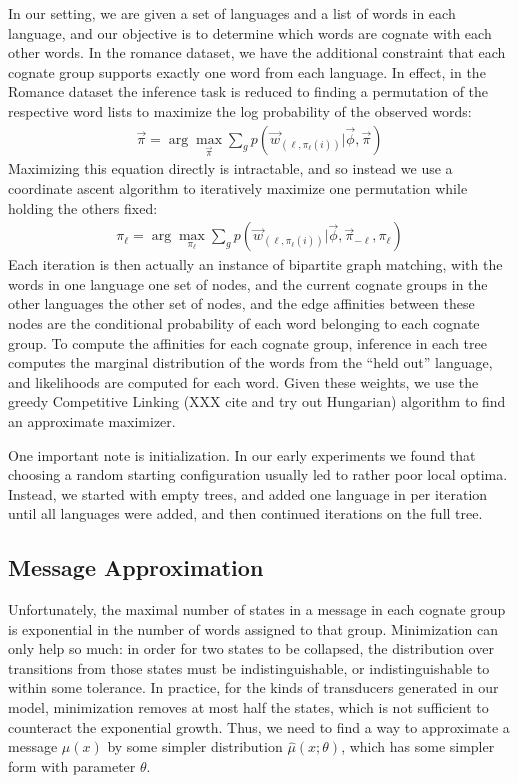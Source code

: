 \documentclass[11pt,a4paper]{article}
\begin{document}
In our setting, we are given a set of languages and a list of words
in each language, and our objective is to determine which words are
cognate with each other words. In the romance dataset, we have the
additional constraint that each cognate group supports exactly one
word from each language. In effect, in the Romance dataset the 
inference task is reduced to finding a permutation of the respective
word lists to maximize the log probability of the observed words:
\begin{equation}
  \begin{split}
    \vec{\pi} = \arg\!\max_{\vec \pi} \sum_{g} p(\vec w_{(\ell,\pi_\ell(i))}|\vec \phi,\vec \pi)
   \end{split}
 \end{equation}
Maximizing this equation directly is intractable, and so instead
we use a coordinate ascent algorithm to iteratively maximize one
permutation while holding the others fixed:
\begin{equation}
  \begin{split}
    \pi_\ell = \arg\!\max_{\pi_\ell} \sum_{g} p(\vec w_{(\ell,\pi_\ell(i))}|\vec \phi,\vec \pi_{-\ell},\pi_\ell)
  \end{split}
\end{equation}
Each iteration is then actually an instance of bipartite graph
matching, with the words in one language one set of nodes, and the
current cognate groups in the other languages the other set of
nodes, and the edge affinities between these nodes are the conditional
probability of each word belonging to each cognate group. To compute
the affinities for each cognate group, inference in each tree
computes the marginal distribution of the words from the ``held
out'' language, and likelihoods are computed for each word.  Given
these weights, we use the greedy Competitive Linking (XXX cite and
try out Hungarian) algorithm to find an approximate maximizer.

One important note is initialization. In our early experiments we
found that choosing a random starting configuration usually led to
rather poor local optima. Instead, we started with empty trees, and
added one language in per iteration until all languages were added,
and then continued iterations on the full tree.

\subsection{Message Approximation}

Unfortunately, the maximal number of states in a message in each
cognate group is exponential in the number of words assigned to
that group. Minimization can only help so much: in order for two
states to be collapsed, the distribution over transitions from those
states must be indistinguishable, or indistinguishable to within
some tolerance. In practice, for the kinds of transducers generated
in our model, minimization removes at most half the states, which
is not sufficient to counteract the exponential growth. Thus, we
need to find a way to approximate a message $\mu(x)$ by some simpler
distribution $\hat\mu(x;\theta)$, which has some simpler form with
parameter $\theta$.
\end{document}
